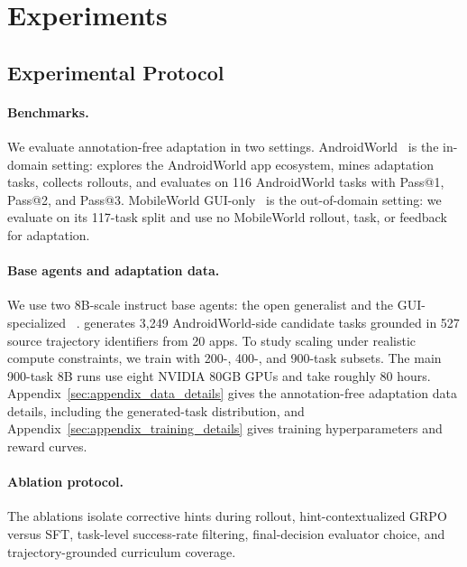 \section{Experiments}
\label{sec:experiments}

\subsection{Experimental Protocol}

\paragraph{Benchmarks.}
We evaluate annotation-free adaptation in two settings. AndroidWorld~\citep{rawles2024androidworld} is the in-domain setting: \ourmethod explores the AndroidWorld app ecosystem, mines adaptation tasks, collects \hifpo rollouts, and evaluates on 116 AndroidWorld tasks with Pass@1, Pass@2, and Pass@3. MobileWorld GUI-only~\citep{kong2026mobileworld} is the out-of-domain setting: we evaluate on its 117-task split and use no MobileWorld rollout, task, or feedback for adaptation.

\paragraph{Base agents and adaptation data.}
We use two 8B-scale instruct base agents: the open generalist  and the GUI-specialized ~\citep{bai2025qwen3,xu2026mobile}. \ourmethod generates 3,249 AndroidWorld-side candidate tasks grounded in 527 source trajectory identifiers from 20 apps. To study scaling under realistic compute constraints, we train with 200-, 400-, and 900-task subsets. The main 900-task 8B runs use eight NVIDIA 80GB GPUs and take roughly 80 hours. Appendix~\ref{sec:appendix_data_details} gives the annotation-free adaptation data details, including the generated-task distribution, and Appendix~\ref{sec:appendix_training_details} gives training hyperparameters and reward curves.

\paragraph{Ablation protocol.}
The ablations isolate corrective hints during rollout, hint-contextualized GRPO versus SFT, task-level success-rate filtering, final-decision evaluator choice, and trajectory-grounded curriculum coverage.
